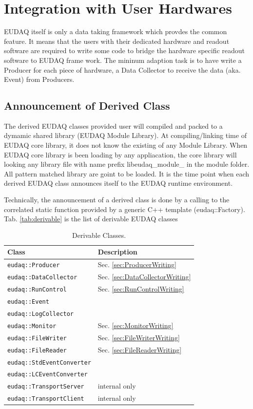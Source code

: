 \section{Integration with User Hardwares}\label{sec:Integration}
EUDAQ itself is only a data taking framework which provdes the common feature. It means that the users with their dedicated hardware and readout software are required to write some code to bridge the hardware specific readout software to EUDAQ frame work. The mininum adaption task is to have write a Producer for each piece of hardware, a Data Collector to receive the data (aka. Event) from Producers. 

\subsection{Announcement of Derived Class}
The derived EUDAQ classes provided user will compiled and packed to a dymamic shared library (EUDAQ Module Library). At compiling/linking time of EUDAQ core library, it does not know the existing of any Module Library. When EUDAQ core library is been loading by any appliacation, the core library will looking any library file with name prefix libeudaq\_module\_ in the module folder. All pattern matched library are goint to be loaded. It is the time point when each derived EUDAQ class announces itself to the EUDAQ runtime environment.

Technically, the announcement of a derived class is done by a calling to the correlated static function provided by a generic C++ template (eudaq::Factory). Tab. \autoref{tab:derivable} is the list of derivable EUDAQ classes

\begin{table}
\centering
\small
\begin{tabular}{ l | l }
  \textbf{Class} & \textbf{Description}\\
  \hline
  \texttt{eudaq::Producer} & Sec. \ref{sec:ProducerWriting}\\
  \texttt{eudaq::DataCollector} & Sec. \ref{sec:DataCollectorWriting}\\
  \texttt{eudaq::RunControl} & Sec. \ref{sec:RunControlWriting}\\
  \texttt{eudaq::Event} &  \\
  \texttt{eudaq::LogCollector} & \\
  \texttt{eudaq::Monitor} & Sec. \ref{sec:MonitorWriting}\\
  \texttt{eudaq::FileWriter} & Sec. \ref{sec:FileWriterWriting}\\
  \texttt{eudaq::FileReader} & Sec. \ref{sec:FileReaderWriting}\\
  \texttt{eudaq::StdEventConverter} & \\
  \texttt{eudaq::LCEventConverter} & \\
  \texttt{eudaq::TransportServer} & internal only \\
  \texttt{eudaq::TransportClient} & internal only \\
\end{tabular}
\caption{Derivable Classes.}
\label{tab:derivable}
\end{table}

